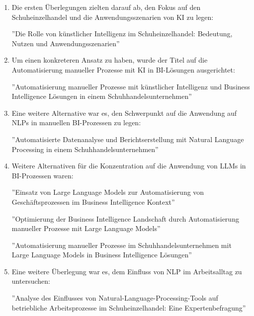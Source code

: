 \begin{enumerate}
    \item Die ersten Überlegungen zielten darauf ab, den Fokus auf den Schuheinzelhandel und die Anwendungsszenarien von KI zu legen:
    
    ''Die Rolle von künstlicher Intelligenz im Schuheinzelhandel: Bedeutung, Nutzen und Anwendungsszenarien''

    \item Um einen konkreteren Ansatz zu haben, wurde der Titel auf die Automatisierung manueller Prozesse mit KI in BI-Lösungen ausgerichtet:
    
    ''Automatisierung manueller Prozesse mit künstlicher Intelligenz und Business Intelligence Lösungen in einem Schuhhandelsunternehmen''

    \item Eine weitere Alternative war es, den Schwerpunkt auf die Anwendung auf NLPs in manuellen BI-Prozessen zu legen:
    
    ''Automatisierte Datenanalyse und Berichtserstellung mit Natural Language Processing in einem Schuhhandelsunternehmen''

    \item Weitere Alternativen für die Konzentration auf die Anwendung von LLMs in BI-Prozessen waren:
    
    ''Einsatz von Large Language Models zur Automatisierung von Geschäftsprozessen im Business Intelligence Kontext''

    ''Optimierung der Business Intelligence Landschaft durch Automatisierung manueller Prozesse mit Large Language Models''

    ''Automatisierung manueller Prozesse im Schuhhandelsunternehmen mit Large Language Models in Business Intelligence Lösungen''

    \item  Eine weitere Überlegung war es, dem Einfluss von NLP im Arbeitsalltag zu untersuchen:

    ''Analyse des Einflusses von Natural-Language-Processing-Tools auf betriebliche Arbeitsprozesse im Schuheinzelhandel: Eine Expertenbefragung''

\end{enumerate}

\clearpage